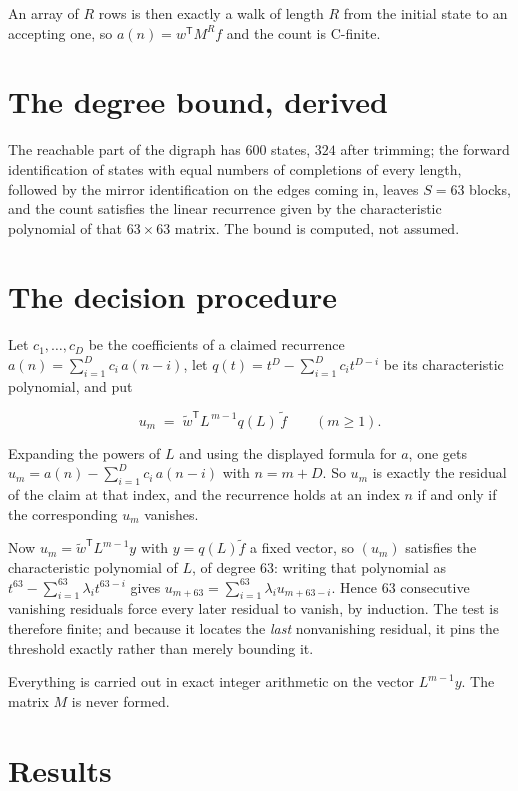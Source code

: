 \documentclass[11pt]{article}
\theoremstyle{definition}
\begin{document}
An array of $R$ rows is then exactly a walk of length $R$ from the initial state to an accepting one, so $a(n) = w^{\mathsf T}M^{R}f$ and the count is C-finite.

\section{The degree bound, derived}

The reachable part of the digraph has $600$ states, $324$ after trimming; the forward identification of states with equal numbers of completions of every length, followed by the mirror identification on the edges coming in, leaves $S = 63$ blocks, and the count satisfies the linear recurrence given by the characteristic polynomial of that $63\times63$ matrix. The bound is computed, not assumed.

\section{The decision procedure}

Let $c_1,\dots,c_D$ be the coefficients of a claimed recurrence $a(n) = \sum_{i=1}^{D} c_i\,a(n-i)$, let $q(t) = t^{D} - \sum_{i=1}^{D} c_i t^{D-i}$ be its characteristic polynomial, and put

\[u_m \;=\; \tilde w^{\mathsf T} L^{\,m-1} q(L)\,\tilde f \qquad (m \ge 1).\]

Expanding the powers of $L$ and using the displayed formula for $a$, one gets $u_m = a(n) - \sum_{i=1}^{D} c_i\,a(n-i)$ with $n = m + D$. So $u_m$ is exactly the residual of the claim at that index, and the recurrence holds at an index $n$ if and only if the corresponding $u_m$ vanishes.

Now $u_m = \tilde w^{\mathsf T} L^{m-1} y$ with $y = q(L)\tilde f$ a fixed vector, so $(u_m)$ satisfies the characteristic polynomial of $L$, of degree $63$: writing that polynomial as $t^{63} - \sum_{i=1}^{63} \lambda_i t^{63-i}$ gives $u_{m+63} = \sum_{i=1}^{63} \lambda_i u_{m+63-i}$. Hence $63$ consecutive vanishing residuals force every later residual to vanish, by induction. The test is therefore finite; and because it locates the {\itshape last} nonvanishing residual, it pins the threshold exactly rather than merely bounding it.

Everything is carried out in exact integer arithmetic on the vector $L^{m-1}y$. The matrix $M$ is never formed.

\section{Results}
\end{document}

